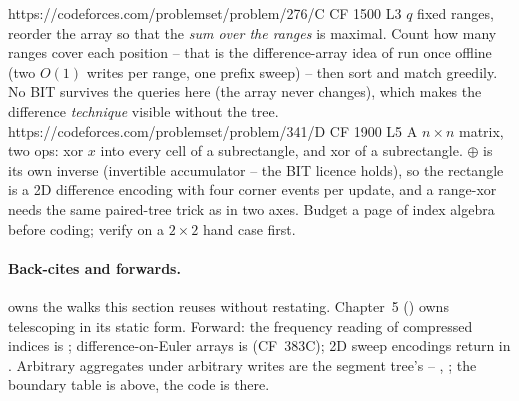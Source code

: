 \begin{practiceset}
    {https://codeforces.com/problemset/problem/276/C}
    {CF 1500 L3}
    {\(q\) fixed ranges, reorder the array so that the \emph{sum over the
     ranges} is maximal.  Count how many ranges cover each position --
     that is the difference-array idea of  run once
     offline (two \(O(1)\) writes per range, one prefix sweep) -- then sort
     and match greedily.  No BIT survives the queries here (the array never
     changes), which makes the difference \emph{technique} visible without
     the tree.}
    {https://codeforces.com/problemset/problem/341/D}
    {CF 1900 L5}
    {A \(n\times n\) matrix, two ops: xor \(x\) into every cell of a
     subrectangle, and xor of a subrectangle.  \(\oplus\) is its own inverse
     (invertible accumulator -- the BIT licence holds), so the rectangle is
     a 2D difference encoding with four corner events per update, and a
     range-xor needs the same paired-tree trick as  in
     two axes.  Budget a page of index algebra before coding; verify on a
     \(2\times2\) hand case first.}
\end{practiceset}

\paragraph{Back-cites and forwards.}
 owns the walks this section reuses without restating.
Chapter~5 () owns telescoping in its static form.
Forward: the frequency reading of compressed indices is
; difference-on-Euler arrays is 
(CF~383C); 2D sweep encodings return in .  Arbitrary
aggregates under arbitrary writes are the segment tree's -- ,
; the boundary table is above, the code is there.

